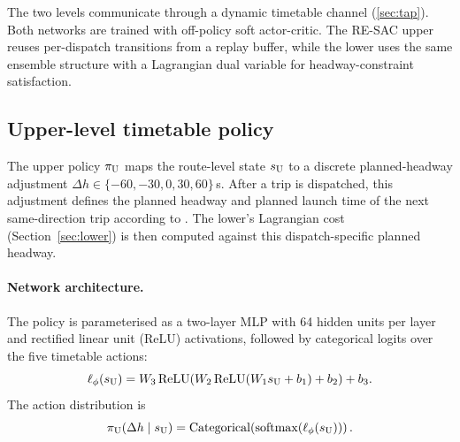 The two levels communicate through a dynamic timetable channel (\cref{sec:tap}).
Both networks are trained with off-policy soft actor-critic. The RE-SAC upper reuses per-dispatch transitions from a replay buffer, while the lower uses the same ensemble structure with a Lagrangian dual variable for headway-constraint satisfaction.

\subsection{Upper-level timetable policy}
\label{sec:upper}

The upper policy $\pi_{\mathrm{U}}$ maps the route-level state $s_{\mathrm{U}}$ to a discrete planned-headway adjustment $\Delta h \in \{-60,-30,0,30,60\}$\,s.
After a trip is dispatched, this adjustment defines the planned headway and planned launch time of the next same-direction trip according to .
The lower's Lagrangian cost (Section~\ref{sec:lower}) is then computed against this dispatch-specific planned headway.

\paragraph{Network architecture.}
The policy is parameterised as a two-layer MLP with 64 hidden units per layer and rectified linear unit (ReLU) activations, followed by categorical logits over the five timetable actions:
\begin{equation}
\label{eq:upper_net}
    \ell_{\phi}(s_{\mathrm{U}}) = W_3 \, \mathrm{ReLU}(W_2 \, \mathrm{ReLU}(W_1 s_{\mathrm{U}} + b_1) + b_2) + b_3 .
\end{equation}
The action distribution is
\begin{equation}
\label{eq:upper_action_method}
    \pi_{\mathrm{U}}(\Delta h \mid s_{\mathrm{U}}) =
    \mathrm{Categorical}\!\left(\mathrm{softmax}(\ell_{\phi}(s_{\mathrm{U}}))\right).
\end{equation}

